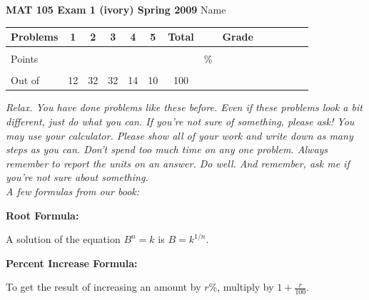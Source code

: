 \documentclass[12pt]{article}
\begin{document}
\textbf{MAT 105 Exam 1 (ivory) Spring 2009} \hspace{.4in} {\large Name} \hrulefill

\begin{center}

\begin{tabular}
{|l|c|c|c|c|c|c|c|c|c|c|c|c|c|} \hline

 Problems & \hspace{5 pt} 1 \hspace{5 pt}  & \hspace{5 pt} 2 \hspace{5 pt} & \hspace{5 pt} 3 \hspace{5 pt} & \hspace{5 pt} 4 \hspace{5 pt} & \hspace{5 pt} 5 \hspace{5 pt} & \hspace{5 pt} Total  \hspace{5 pt} & &  \hspace{5 pt} Grade \hspace{5 pt}  \\ \hline
&&&&&&&&\\  
Points &&&&&&&    \hspace{.8in}\% &  \\ 
&&&&&&&& \\  \hline
Out of & 12 & 32 & 32 & 14 & 10 &100 & & \\ \hline

\end {tabular}

\end{center}

\vspace{.2in}

 \emph{Relax.  You have done problems like these before.  Even if these problems look a bit different, just do what you can.  If you're not sure of something, please ask! You may use your calculator.  Please show all of your work and write down as many steps as you can.  Don't spend too much time on any one problem.  Always remember to report the units on an answer. Do well.  And remember, ask me if you're not sure about something.} \\

\vspace{.5in} 
\noindent \emph{A few formulas from our book:}
\begin{center}

\textbf{Root Formula:} 

A solution of the equation $B^n=k$ is $B=k^{1/n}$.

\vspace{.2in} 

\textbf{Percent Increase Formula:} 

To get the result of increasing an amount by $r$\%, multiply by $1 + \frac{r}{100}$.

\end{center}
\end{document}
